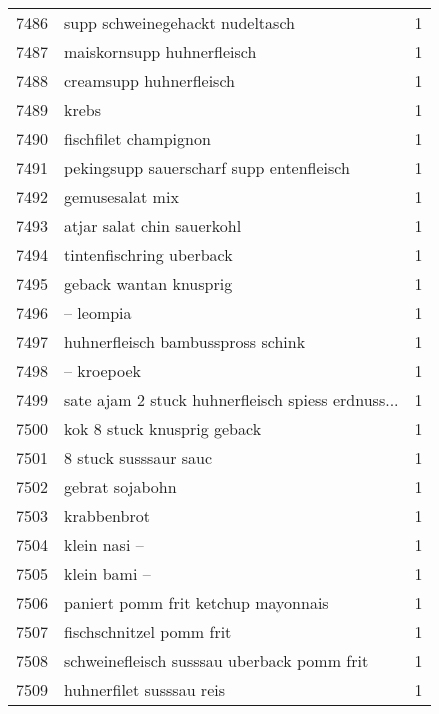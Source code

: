 \begin{tabular}{llr}
7486 &                    supp schweinegehackt nudeltasch &      1 \\
7487 &                         maiskornsupp huhnerfleisch &      1 \\
7488 &                            creamsupp huhnerfleisch &      1 \\
7489 &                                              krebs &      1 \\
7490 &                              fischfilet champignon &      1 \\
7491 &           pekingsupp sauerscharf supp entenfleisch &      1 \\
7492 &                                    gemusesalat mix &      1 \\
7493 &                         atjar salat chin sauerkohl &      1 \\
7494 &                           tintenfischring uberback &      1 \\
7495 &                             geback wantan knusprig &      1 \\
7496 &                                          – leompia &      1 \\
7497 &                  huhnerfleisch bambusspross schink &      1 \\
7498 &                                         – kroepoek &      1 \\
7499 &  sate ajam 2 stuck huhnerfleisch spiess erdnuss... &      1 \\
7500 &                        kok 8 stuck knusprig geback &      1 \\
7501 &                              8 stuck susssaur sauc &      1 \\
7502 &                                    gebrat sojabohn &      1 \\
7503 &                                        krabbenbrot &      1 \\
7504 &                                       klein nasi – &      1 \\
7505 &                                       klein bami – &      1 \\
7506 &                paniert pomm frit ketchup mayonnais &      1 \\
7507 &                           fischschnitzel pomm frit &      1 \\
7508 &         schweinefleisch susssau uberback pomm frit &      1 \\
7509 &                           huhnerfilet susssau reis &      1 \\

\end{tabular}
